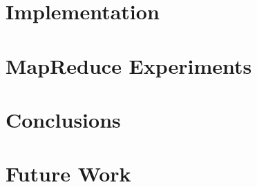 \chapter{Implementation}
\acresetall

\chapter{MapReduce Experiments}
\acresetall

\chapter{Conclusions}
\acresetall

\chapter{Future Work}
\acresetall

\cleardoublepage
\appendix






